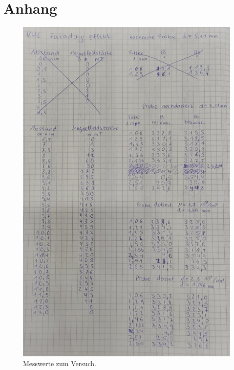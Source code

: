 \section{Anhang}
\label{sec:Anhang}
\begin{figure}[H]
   \centering
    \includegraphics[scale=0.3]{Abbildungen/Kladde.jpg}
   \caption{Messwerte zum Versuch.}
\end{figure}
\pagebreak